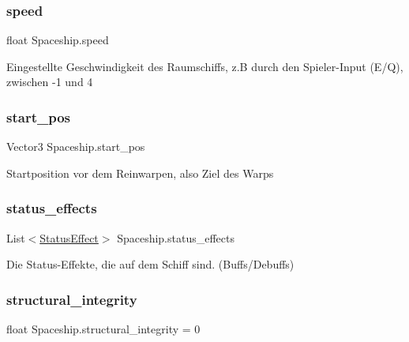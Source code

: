 \mbox{\label{class_spaceship_a66af2928c7df3d1050d5a730a179b922}} 
\subsubsection{\texorpdfstring{speed}{speed}}
{\footnotesize\ttfamily float Spaceship.\+speed}



Eingestellte Geschwindigkeit des Raumschiffs, z.\+B durch den Spieler-\/\+Input (E/Q), zwischen -\/1 und 4 

\mbox{\label{class_spaceship_a55f3116d23628f01925dd1b7f4a053e9}} 
\subsubsection{\texorpdfstring{start\+\_\+pos}{start\_pos}}
{\footnotesize\ttfamily Vector3 Spaceship.\+start\+\_\+pos}



Startposition vor dem Reinwarpen, also Ziel des Warps 

\mbox{\label{class_spaceship_a54d20dc0f35e14abec24c50e060353b8}} 
\subsubsection{\texorpdfstring{status\+\_\+effects}{status\_effects}}
{\footnotesize\ttfamily List$<$\hyperlink{class_status_effect}{Status\+Effect}$>$ Spaceship.\+status\+\_\+effects}



Die Status-\/\+Effekte, die auf dem Schiff sind. (Buffs/\+Debuffs) 

\mbox{\label{class_spaceship_a7ac37ce79a081b8bc4cdedf741be9043}} 
\subsubsection{\texorpdfstring{structural\+\_\+integrity}{structural\_integrity}}
{\footnotesize\ttfamily float Spaceship.\+structural\+\_\+integrity = 0}



